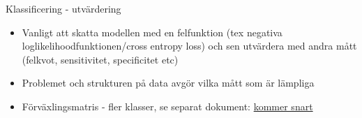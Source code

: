 \documentclass[10pt,english]{beamer}
\begin{document}
\begin{frame}{Klassificering - utvärdering}


\begin{itemize}
    \item Vanligt att skatta modellen med en felfunktion (tex negativa loglikelihoodfunktionen/cross entropy loss) och sen utvärdera med andra mått (felkvot, sensitivitet, specificitet etc)
    \item Problemet och strukturen på data avgör vilka mått som är lämpliga
    \item Förväxlingsmatris - fler klasser, se separat dokument: \href{https://raw.githubusercontent.com/STIMALiU/732G57_DM/master/other/confusion\%20matrix\%20classification\%20evaluation\%20metrics.pdf}{kommer snart}
\end{itemize}
    
\end{frame}
\end{document}
